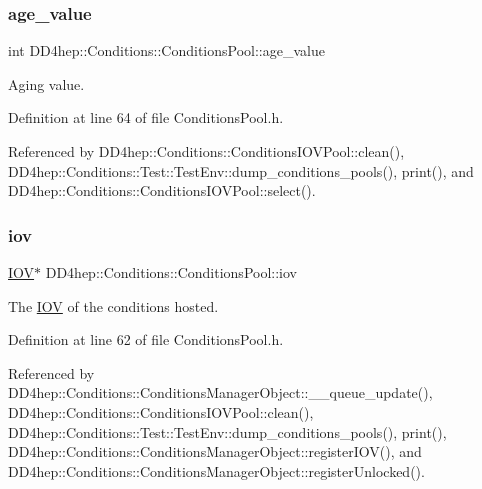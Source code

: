 \subsubsection{\texorpdfstring{age\+\_\+value}{age\_value}}
{\footnotesize\ttfamily int D\+D4hep\+::\+Conditions\+::\+Conditions\+Pool\+::age\+\_\+value}



Aging value. 



Definition at line 64 of file Conditions\+Pool.\+h.



Referenced by D\+D4hep\+::\+Conditions\+::\+Conditions\+I\+O\+V\+Pool\+::clean(), D\+D4hep\+::\+Conditions\+::\+Test\+::\+Test\+Env\+::dump\+\_\+conditions\+\_\+pools(), print(), and D\+D4hep\+::\+Conditions\+::\+Conditions\+I\+O\+V\+Pool\+::select().

\hypertarget{class_d_d4hep_1_1_conditions_1_1_conditions_pool_a5c86deb9085a420b2d8355ca835f3fc9}{}\label{class_d_d4hep_1_1_conditions_1_1_conditions_pool_a5c86deb9085a420b2d8355ca835f3fc9} 
\subsubsection{\texorpdfstring{iov}{iov}}
{\footnotesize\ttfamily \hyperlink{class_d_d4hep_1_1_i_o_v}{I\+OV}$\ast$ D\+D4hep\+::\+Conditions\+::\+Conditions\+Pool\+::iov}



The \hyperlink{class_d_d4hep_1_1_i_o_v}{I\+OV} of the conditions hosted. 



Definition at line 62 of file Conditions\+Pool.\+h.



Referenced by D\+D4hep\+::\+Conditions\+::\+Conditions\+Manager\+Object\+::\+\_\+\+\_\+queue\+\_\+update(), D\+D4hep\+::\+Conditions\+::\+Conditions\+I\+O\+V\+Pool\+::clean(), D\+D4hep\+::\+Conditions\+::\+Test\+::\+Test\+Env\+::dump\+\_\+conditions\+\_\+pools(), print(), D\+D4hep\+::\+Conditions\+::\+Conditions\+Manager\+Object\+::register\+I\+O\+V(), and D\+D4hep\+::\+Conditions\+::\+Conditions\+Manager\+Object\+::register\+Unlocked().

\hypertarget{class_d_d4hep_1_1_conditions_1_1_conditions_pool_a517c78c83270296921430bbd85ab1782}{}\label{class_d_d4hep_1_1_conditions_1_1_conditions_pool_a517c78c83270296921430bbd85ab1782} 
